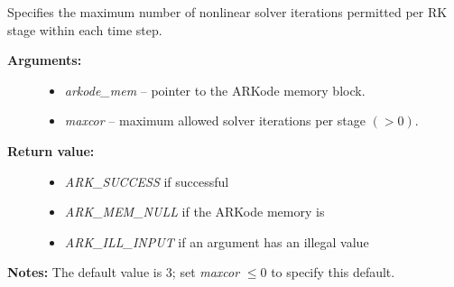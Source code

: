 \documentclass[letterpaper,10pt,english]{sphinxmanual}
\begin{document}

\begin{fulllineitems}
\label{c_interface/User_callable:ARKodeSetMaxNonlinIters}
Specifies the maximum number of nonlinear solver
iterations permitted per RK stage within each time step.
\begin{description}
\item[{\textbf{Arguments:}}] \leavevmode\begin{itemize}
\item {} 
\emph{arkode\_mem} -- pointer to the ARKode memory block.

\item {} 
\emph{maxcor} -- maximum allowed solver iterations per stage $(>0)$.

\end{itemize}

\item[{\textbf{Return value:}}] \leavevmode\begin{itemize}
\item {} 
\emph{ARK\_SUCCESS} if successful

\item {} 
\emph{ARK\_MEM\_NULL} if the ARKode memory is 

\item {} 
\emph{ARK\_ILL\_INPUT} if an argument has an illegal value

\end{itemize}

\end{description}

\textbf{Notes:} The default value is 3; set \emph{maxcor} $\le 0$
to specify this default.

\end{fulllineitems}

\end{document}
